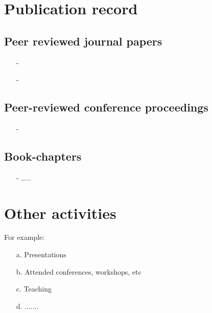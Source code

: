 \documentclass[11pt,a4paper]{article}
\begin{document}
\section{Publication record}
\subsection{Peer reviewed journal papers}
\begin{itemize}
	\item[-] \cite{dummy_journal1}
	\item[-] \cite{dummy_journal2}
\end{itemize}
\subsection{Peer-reviewed conference proceedings}
\begin{itemize}
	\item[-] \cite{dummy_conference1}
\end{itemize}
\subsection{Book-chapters}
\begin{itemize}
	\item[-] .....
\end{itemize}
\section{Other activities}
For example:
\begin{itemize}
	\item[a.] Presentations
	\item[b.] Attended conferences, workshops, etc 
	\item[c.] Teaching
	\item[d.] .......
\end{itemize}
  
\cleardoublepage



\end{document}
